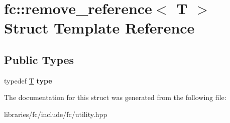 \hypertarget{structfc_1_1remove__reference}{}\section{fc\+:\+:remove\+\_\+reference$<$ T $>$ Struct Template Reference}
\label{structfc_1_1remove__reference}
\subsection*{Public Types}
\begin{DoxyCompactItemize}
\item 
\mbox{\label{structfc_1_1remove__reference_ab612bc0231f86a0cf7e84835efcaeab6}} 
typedef \mbox{\hyperlink{struct_t}{T}} {\bfseries type}
\end{DoxyCompactItemize}


The documentation for this struct was generated from the following file\+:\begin{DoxyCompactItemize}
\item 
libraries/fc/include/fc/utility.\+hpp\end{DoxyCompactItemize}
